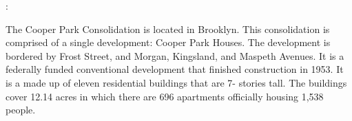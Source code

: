 :        

      

The Cooper Park Consolidation is located in Brooklyn. This consolidation is comprised of a single development: Cooper Park Houses. The development is bordered by Frost Street, and Morgan, Kingsland, and Maspeth Avenues. It is a federally funded conventional development that finished construction in 1953. It is a made up of eleven residential buildings that are 7- stories tall. The buildings cover 12.14 acres in which there are 696 apartments officially housing 1,538 people.    